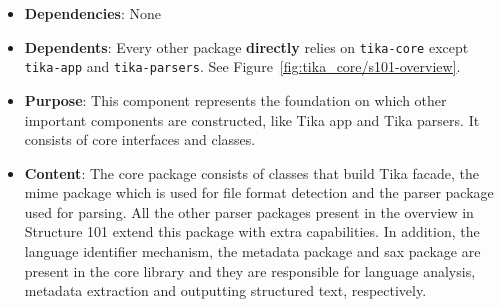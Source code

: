 \documentclass{article}
\begin{document}
\begin{itemize}
    \item \textbf{Dependencies}: None
    \item \textbf{Dependents}: Every other package
    \textbf{directly} relies on \texttt{tika-core} except \texttt{tika-app} and \texttt{tika-parsers}. See Figure~\ref{fig:tika_core/s101-overview}.
    \item\textbf{Purpose}: This component represents the foundation on which other important components are constructed, like Tika app and Tika parsers. It consists of core interfaces and classes. 

\item\textbf{Content}: The core package consists of classes that build Tika facade, the mime package which is used for file format detection and the parser package used for parsing. All the other parser packages present in the overview in Structure 101 extend this package with extra capabilities. In addition, the language identifier mechanism, the metadata package and sax package are present in the core library and they are responsible for language analysis, metadata extraction and outputting structured text, respectively.

\end{itemize}
\end{document}

